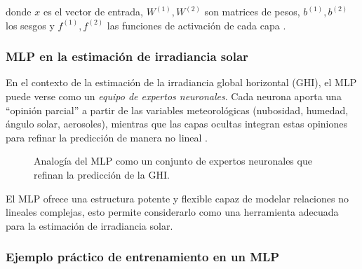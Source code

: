 donde $x$ es el vector de entrada, $W^{(1)}, W^{(2)}$ son matrices de pesos, $b^{(1)}, b^{(2)}$ los sesgos y $f^{(1)}, f^{(2)}$ las funciones de activación de cada capa \cite{ghanou2016mlp}.

\subsubsection*{MLP en la estimación de irradiancia solar}

En el contexto de la estimación de la irradiancia global horizontal (GHI), el MLP puede verse como un \textit{equipo de expertos neuronales}. Cada neurona aporta una “opinión parcial” a partir de las variables meteorológicas (nubosidad, humedad, ángulo solar, aerosoles), mientras que las capas ocultas integran estas opiniones para refinar la predicción de manera no lineal \cite{torobayona2012mlp}.  

\begin{figure}[H] 
\centering 
{}
\caption{Analogía del MLP como un conjunto de expertos neuronales que refinan la predicción de la GHI.}
\label{fig:mlp_experts}
\end{figure}

El MLP ofrece una estructura potente y flexible capaz de modelar relaciones no lineales complejas, esto permite considerarlo como una herramienta adecuada para la estimación de irradiancia solar.

\subsubsection*{Ejemplo práctico de entrenamiento en un MLP}

